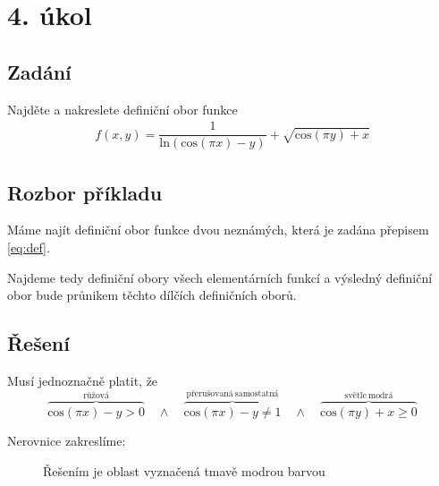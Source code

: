 \section{4. úkol}
\subsection*{Zadání}
Najděte a nakreslete definiční obor funkce 
\begin{eqnarray}f(x,y) = \dfrac{1}{\mathrm{ln}(\mathrm{cos}(\pi x) - y)} + \sqrt{\mathrm{cos}(\pi y) + x}
\label{eq:def}
\end{eqnarray}
\subsection*{Rozbor příkladu}
Máme najít definiční obor funkce dvou neznámých, která je zadána přepisem \ref{eq:def}. 

Najdeme tedy definiční obory všech elementárních funkcí a výsledný definiční obor bude průnikem těchto dílčích definičních oborů.

\subsection*{Řešení}
Musí jednoznačně platit, že
\begin{displaymath}
\overbrace{\mbox{cos}(\pi x) - y  > 0}^{\mathrm{růžová}} \quad \wedge \quad \overbrace{\mbox{cos}(\pi x) - y \neq 1}^\mathrm{přerušovaná\ samostatná} \quad \wedge \quad \overbrace{\mbox{cos}(\pi y) + x \geq 0}^\mathrm{světle\ modrá}
\end{displaymath}

\noindent Nerovnice zakreslíme:

\begin{figure}[H]
	\centering
	
	\caption{Řešením je oblast vyznačená tmavě modrou barvou}
\end{figure}